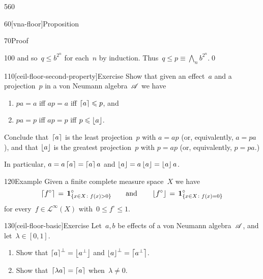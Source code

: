 \begin{parsec}{560}
\begin{point}{60}[vna-floor]{Proposition}
\begin{point}{70}{Proof}
\begin{point}{100}
and so~$q\leq b^{2^n}$ for each~$n$ by induction.
Thus~$q\leq p\equiv\bigwedge_n b^{2^n}$.\qed
\end{point}
\end{point}
\end{point}
\begin{point}{110}[ceil-floor-second-property]{Exercise}%
Show that given an effect~$a$ and a projection~$p$
in a von Neumann algebra~$\mathscr{A}$ we have
\begin{enumerate}
\item
$pa=a$ iff $ap=a$ iff $\left\lceil a\right\rceil\leqslant p$, and
\item
$pa=p$ iff $ap=p$ iff $p\leqslant \left\lfloor a\right\rfloor$.
\end{enumerate}
Conclude that~$\left\lceil a\right\rceil$
is the least projection~$p$ with $a=a p$
(or, equivalently, $a=pa$),
and that $\left\lfloor a\right\rfloor$
is the greatest projection~$p$ with $p=a p$
(or, equivalently, $p=pa$.)

In particular,
$a=a\left\lceil a\right\rceil=\left\lceil a\right\rceil a$
and $\left\lfloor a\right\rfloor=a\left\lfloor a\right\rfloor=\left\lfloor a\right\rfloor a$.
\end{point}
\begin{point}{120}{Example}%
Given a finite complete measure space~$X$
we have
\begin{equation*}
\left\lceil f^\circ\right\rceil
	\,=\,\mathbf{1}_{\{x\in X\colon f(x)>0\}}^\circ
	\qquad
	\text{and}\qquad
	\left\lfloor f^\circ\right\rfloor
	\,=\, \mathbf{1}_{\{x\in X\colon  f(x)=0\}}^\circ
\end{equation*}
for every~$f\in\mathcal{L}^\infty(X)$
with~$0\leq f^\circ \leq 1$.
\end{point}
\begin{point}{130}[ceil-floor-basic]{Exercise}%
Let~$a,b$ be effects of a von Neumann algebra~$\mathscr{A}$,
and let~$\lambda\in [0,1]$.
\begin{enumerate}
\item
Show that $\left\lceil a\right\rceil^\perp = \left\lfloor a^\perp\right\rfloor$
and $\left\lfloor a\right\rfloor^\perp = \left\lceil a^\perp\right\rceil$.
\item
Show that~$\left\lceil\lambda a\right\rceil = \left\lceil a\right\rceil$
when~$\lambda\neq 0$.


\end{enumerate}
\end{point}
\end{parsec}
